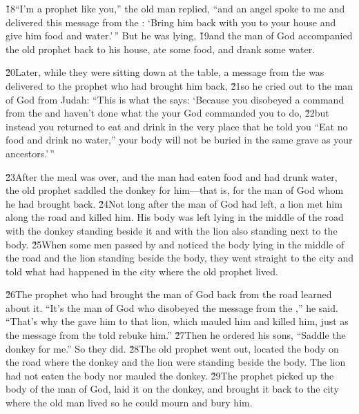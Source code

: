 \v{18}``I'm a prophet like you,'' the old man replied, ``and an angel spoke to me and delivered this message from the : `Bring him back with you to your house and give him food and water.'\,'' But he was lying, \v{19}and the man of God accompanied the old prophet back to his house, ate some food, and drank some water.

\v{20}Later, while they were sitting down at the table, a message from the  was delivered to the prophet who had brought him back, \v{21}so he cried out to the man of God from Judah: ``This is what the  says: `Because you disobeyed a command from the  and haven't done what the  your God commanded you to do, \v{22}but instead you returned to eat and drink in the very place that he told you ``Eat no food and drink no water,'' your body will not be buried in the same grave as your ancestors.'\,''

\v{23}After the meal was over, and the man had eaten food and had drunk water, the old prophet saddled the donkey for him---that is, for the man of God whom he had brought back. \v{24}Not long after the man of God had left, a lion met him along the road and killed him. His body was left lying in the middle of the road with the donkey standing beside it and with the lion also standing next to the body. \v{25}When some men passed by and noticed the body lying in the middle of the road and the lion standing beside the body, they went straight to the city and told what had happened in the city where the old prophet lived.

\v{26}The prophet who had brought the man of God back from the road learned about it. ``It's the man of God who disobeyed the message from the ,'' he said. ``That's why the  gave him to that lion, which mauled him and killed him, just as the message from the  told rebuke him.'' \v{27}Then he ordered his sons, ``Saddle the donkey for me.'' So they did. \v{28}The old prophet went out, located the body on the road where the donkey and the lion were standing beside the body. The lion had not eaten the body nor mauled the donkey. \v{29}The prophet picked up the body of the man of God, laid it on the donkey, and brought it back to the city where the old man lived so he could mourn and bury him.

